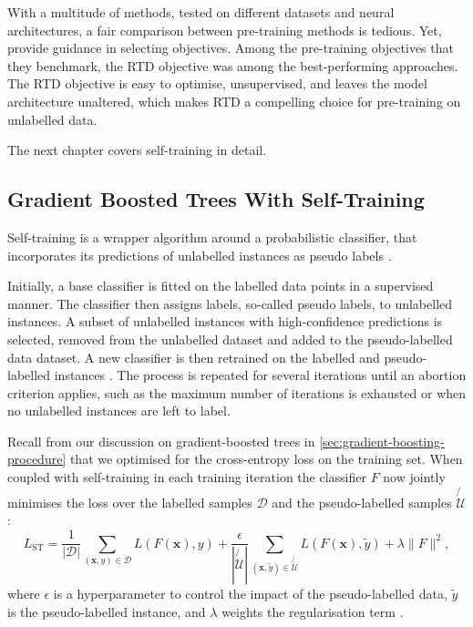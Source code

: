 With a multitude of methods, tested on different datasets and neural architectures, a fair comparison between pre-training methods is tedious. Yet, \textcite[][2-3]{rubachevRevisitingPretrainingObjectives2022} provide guidance in selecting objectives. Among the pre-training objectives that they benchmark, the \gls{RTD} objective was among the best-performing approaches. The \gls{RTD} objective is easy to optimise, unsupervised, and leaves the model architecture unaltered, which makes \gls{RTD} a compelling choice for pre-training on unlabelled data.

The next chapter covers self-training in detail.

\subsection{Gradient Boosted Trees With Self-Training}\label{sec:extensions-to-gradient-boosted-trees}

Self-training is a wrapper algorithm around a probabilistic classifier, that incorporates its predictions of unlabelled instances as pseudo labels \autocite[][190]{yarowskyUnsupervisedWordSense1995}.

Initially, a base classifier is fitted on the labelled data points in a supervised manner. The classifier then assigns labels, so-called pseudo labels, to unlabelled instances. A subset of unlabelled instances with high-confidence predictions is selected, removed from the unlabelled dataset and added to the pseudo-labelled data dataset. A new classifier is then retrained on the labelled and pseudo-labelled instances \autocite[][190--192]{yarowskyUnsupervisedWordSense1995}. The process is repeated for several iterations until an abortion criterion applies, such as the maximum number of iterations is exhausted or when no unlabelled instances are left to label.

Recall from our discussion on gradient-boosted trees in \cref{sec:gradient-boosting-procedure} that we optimised for the cross-entropy loss on the training set. When coupled with self-training in each training iteration the classifier $F$ now jointly minimises the loss over the labelled samples $\mathcal{D}$ and the pseudo-labelled samples $\not{\mathcal{U}}$:
\begin{equation}
    L_{\mathrm{ST}}=\frac{1}{\left|\mathcal{D}\right|} \sum_{(\mathbf{x}, y) \in \mathcal{D}} L(F(\mathbf{x}), y)+\frac{\epsilon}{\left|\not{\mathcal{U}}\right|} \sum_{(\mathbf{x}, \tilde{y}) \in \not{\mathcal{U}}} L(F(\mathbf{x}), \tilde{y})+\lambda\|F\|^2,
\end{equation}
where $\epsilon$ is a hyperparameter to control the impact of the pseudo-labelled data, $\tilde{y}$ is the pseudo-labelled instance, and $\lambda$ weights the regularisation term \autocite[][4]{aminiSelfTrainingSurvey2023}.

